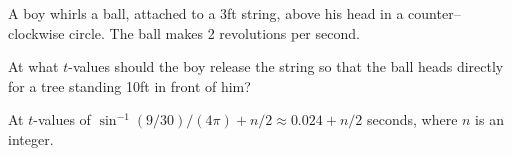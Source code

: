 {A boy whirls a ball, attached to a  3ft string, above his head in a counter--clockwise circle. The ball makes 2 revolutions per second.

At what $t$-values should the boy release the string so that the ball heads directly for a tree standing 10ft in front of him?
}
{At $t$-values of $\sin^{-1}(9/30)/(4\pi) + n/2 \approx 0.024 + n/2$ seconds, where $n$ is an integer.
}
